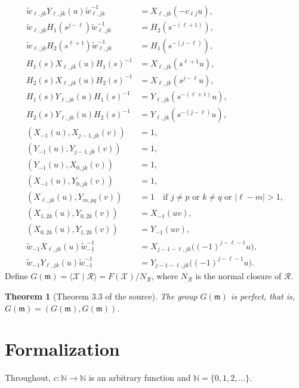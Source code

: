 \documentclass[11pt]{article}
\newtheorem{theorem}{Theorem}[section]
\theoremstyle{definition}
\theoremstyle{remark}
\newcommand{\wt}{\widetilde{w}}
\begin{document}
\begin{align*}
\tag{Im:4b} \wt_{\ell,jk}Y_{\ell,jk}(u)\wt_{\ell,jk}^{-1}&=X_{\ell,jk}(-c_{\ell j}u),\\
\tag{Im:5a} \wt_{\ell,jk}H_1(s^{j-\ell})\wt_{\ell,jk}^{-1}&=H_2(s^{-(\ell+1)}),\\
\tag{Im:5b} \wt_{\ell,jk}H_2(s^{\ell+1})\wt_{\ell,jk}^{-1}&=H_1(s^{-(j-\ell)}),\\
\tag{Im:6a} H_1(s)X_{\ell,jk}(u)H_1(s)^{-1}&=X_{\ell,jk}(s^{\ell+1}u),\\
\tag{Im:6b} H_2(s)X_{\ell,jk}(u)H_2(s)^{-1}&=X_{\ell,jk}(s^{j-\ell}u),\\
\tag{Im:6c} H_1(s)Y_{\ell,jk}(u)H_1(s)^{-1}&=Y_{\ell,jk}(s^{-(\ell+1)}u),\\
\tag{Im:6d} H_2(s)Y_{\ell,jk}(u)H_2(s)^{-1}&=Y_{\ell,jk}(s^{-(j-\ell)}u),\\
\tag{U:1a} (X_{-1}(u),X_{j-1,jk}(v))&=1,\\
\tag{U:1b} (Y_{-1}(u),Y_{j-1,jk}(v))&=1,\\
\tag{U:1c} (Y_{-1}(u),X_{0,jk}(v))&=1,\\
\tag{U:1d} (X_{-1}(u),Y_{0,jk}(v))&=1,\\
\tag{U:2} (X_{\ell,jk}(u),Y_{m,pq}(v))&=1\quad\text{if } j\ne p \text{ or } k\ne q \text{ or } |\ell-m|>1,\\
\tag{U:3a} (X_{1,2k}(u),Y_{0,2k}(v))&=X_{-1}(uv),\\
\tag{U:3b} (X_{0,2k}(u),Y_{1,2k}(v))&=Y_{-1}(uv),\\
\tag{U:4a} \wt_{-1}X_{\ell,jk}(u)\wt_{-1}^{-1}&=X_{j-1-\ell,jk}\bigl((-1)^{j-\ell-1}u\bigr),\\
\tag{U:4b} \wt_{-1}Y_{\ell,jk}(u)\wt_{-1}^{-1}&=Y_{j-1-\ell,jk}\bigl((-1)^{j-\ell-1}u\bigr).
\end{align*}
Define $G(\mathfrak m)=\langle\mathcal X\mid\mathcal R\rangle=F(\mathcal X)/N_{\mathcal R}$, where $N_{\mathcal R}$ is the normal closure of $\mathcal R$.

\begin{theorem}[Theorem 3.3 of the source]
The group $G(\mathfrak m)$ is perfect, that is, $G(\mathfrak m)=(G(\mathfrak m),G(\mathfrak m))$.
\end{theorem}

\section{Formalization}

Throughout, $c:\mathbb N\to\mathbb N$ is an arbitrary function and $\mathbb N=\{0,1,2,\dots\}$.
\end{document}
